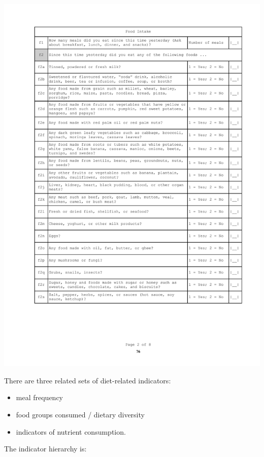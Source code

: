\documentclass[12pt,a4paper]{book}
\providecommand{\tightlist}{%
  \setlength{\itemsep}{0pt}\setlength{\parskip}{0pt}}
\theoremstyle{definition}
\theoremstyle{definition}
\theoremstyle{definition}
\theoremstyle{remark}
\begin{document}
\begin{center}\includegraphics[width=23.92in]{figures/questionnaire02} \end{center}

\newpage

There are three related sets of diet-related indicators:

\begin{itemize}
\tightlist
\item
  meal frequency
\item
  food groups consumed / dietary diversity
\item
  indicators of nutrient consumption.
\end{itemize}

The indicator hierarchy is:
\end{document}
